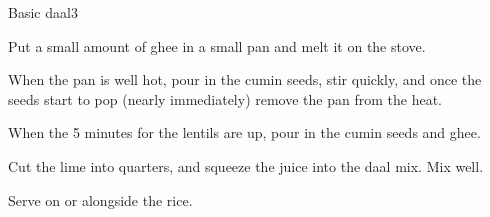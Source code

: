 \documentclass{article}
\begin{document}
\begin{recipe}{Basic daal}{3}
\begin{step}
    \end{step}
    \begin{step}
      \begin{ingrs}
      \end{ingrs}
      \begin{stepdesc}
        Put a small amount of ghee in a small pan and melt it on the stove.
      \end{stepdesc}
    \end{step}
    \begin{step}
      \begin{ingrs}
      \end{ingrs}
      \begin{stepdesc}
        When the pan is well hot, pour in the cumin seeds, stir quickly, and once the seeds start to pop (nearly immediately) remove the pan from the heat.
      \end{stepdesc}
    \end{step}
    \begin{step}
      \begin{ingrs}
      \end{ingrs}
      \begin{stepdesc}
        When the 5 minutes for the lentils are up, pour in the cumin seeds and ghee.
      \end{stepdesc}
    \end{step}
    \begin{step}
      \begin{ingrs}
      \end{ingrs}
      \begin{stepdesc}
        Cut the lime into quarters, and squeeze the juice into the daal mix. Mix well.
      \end{stepdesc}
    \end{step}
    \begin{step}
      \begin{ingrs}
      \end{ingrs}
      \begin{stepdesc}
        Serve on or alongside the rice.
      \end{stepdesc}
    \end{step}
  \end{recipe}
\end{document}
